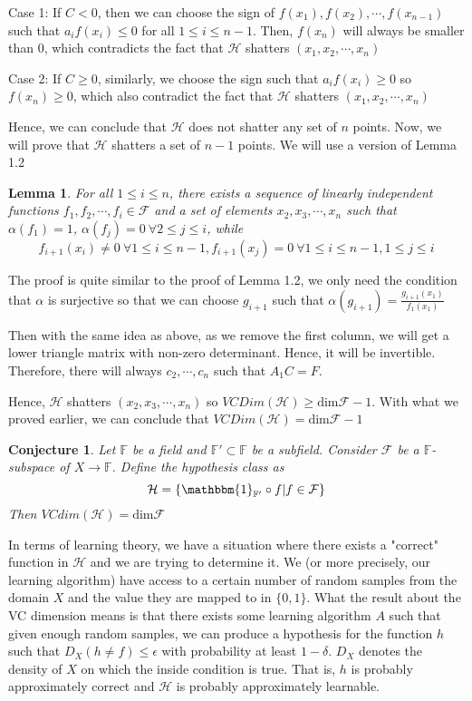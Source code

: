 \documentclass{article}
\newtheorem{conjecture}[theorem]{Conjecture}
\newtheorem{lemma}[theorem]{Lemma}
\begin{document}
Case 1: If $C<0$, then we can choose the sign of $f(x_1),f(x_2),\cdots,f(x_{n-1})$ such that $a_if(x_i) \leq 0$ for all $1 \leq i \leq n-1$. Then, $f(x_n)$ will always be smaller than $0$, which contradicts the fact that $\mathcal{H}$ shatters $(x_1,x_2,\cdots,x_n)$


Case 2: If $C \geq 0$, similarly, we choose the sign such that $a_if(x_i) \geq 0$ so $f(x_n) \geq 0$, which also contradict the fact that $\mathcal{H}$ shatters $(x_1,x_2,\cdots,x_n)$

Hence, we can conclude that $\mathcal{H}$ does not shatter any set of $n$ points. Now, we will prove that $\mathcal{H}$ shatters a set of $n-1$ points. We will use a version of Lemma 1.2
\begin{lemma}
For all $1 \leq i \leq n$, there exists a sequence of linearly independent functions $f_1,f_2,\cdots,f_i \in \mathcal{F}$ and a set of elements $x_2,x_3,\cdots,x_n$ such that $\alpha(f_1)=1$, $\alpha(f_j)=0 \ \forall 2 \leq j \leq i$, while
$$f_{i+1}(x_i) \neq 0 \ \forall 1 \leq i \leq n-1, f_{i+1}(x_j)=0 \ \forall 1 \leq i \leq n-1, 1 \leq j \leq i$$
\end{lemma}
The proof is quite similar to the proof of Lemma 1.2, we only need the condition that $\alpha$ is surjective so that we can choose $g_{i+1}$ such that $\alpha(g_{i+1})=\frac{g_{i+1}(x_1)}{f_1(x_1)}$

Then with the same idea as above, as we remove the first column, we will get a lower triangle matrix with non-zero determinant. Hence, it will be invertible. Therefore, there will always $c_2,\cdots,c_n$ such that $A_1C=F$.

Hence, $\mathcal{H}$ shatters $(x_2,x_3,\cdots,x_n)$ so $VCDim(\mathcal{H}) \geq \text{dim} \mathcal{F}-1$. With what we proved earlier, we can conclude 
that $VCDim(\mathcal{H})=\text{dim} \mathcal{F}-1$

\begin{conjecture}
Let $\mathbb{F}$ be a field and $\mathbb{F}' \subset \mathbb{F}$ be a subfield. Consider $\mathcal{F}$ be a $\mathbb{F}$-subspace of $X \rightarrow \mathbb{F}$. Define the hypothesis class as
$$\mathcal{H}=\{\mathbbm{1}_{\mathbb{F'}} \circ f| f \in \mathcal{F} \}$$
Then $VCdim(\mathcal{H}) = \text{dim} \mathcal{F}$
\end{conjecture}

In terms of learning theory, we have a situation where there exists a "correct" function in $\mathcal{H}$ and we are trying to determine it. We (or more precisely, our learning algorithm) have access to a certain number of random samples from the domain $X$ and the value they are mapped to in $\{0,1\}$. What the result about the VC dimension means is that there exists some learning algorithm $A$ such that given enough random samples, we can produce a hypothesis for the function $h$ such that $D_X(h\neq f) \le \epsilon$ with probability at least $1-\delta$. $D_X$ denotes the density of $X$ on which the inside condition is true. That is, $h$ is probably approximately correct and $\mathcal{H}$ is probably approximately learnable.
\end{document}
